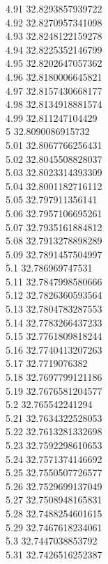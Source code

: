 {4.91	32.8293857939722\\
4.92	32.8270957341098\\
4.93	32.8248122159278\\
4.94	32.8225352146799\\
4.95	32.8202647057362\\
4.96	32.8180006645821\\
4.97	32.8157430668177\\
4.98	32.8134918881574\\
4.99	32.811247104429\\
5	32.8090086915732\\
5.01	32.8067766256431\\
5.02	32.8045508828037\\
5.03	32.8023314393309\\
5.04	32.8001182716112\\
5.05	32.797911356141\\
5.06	32.7957106695261\\
5.07	32.7935161884812\\
5.08	32.7913278898289\\
5.09	32.7891457504997\\
5.1	32.786969747531\\
5.11	32.7847998580666\\
5.12	32.7826360593564\\
5.13	32.7804783287553\\
5.14	32.7783266437233\\
5.15	32.7761809818244\\
5.16	32.7740413207263\\
5.17	32.7719076382\\
5.18	32.7697799121186\\
5.19	32.7676581204577\\
5.2	32.765542241294\\
5.21	32.7634322528053\\
5.22	32.7613281332698\\
5.23	32.7592298610653\\
5.24	32.7571374146692\\
5.25	32.7550507726577\\
5.26	32.7529699137049\\
5.27	32.7508948165831\\
5.28	32.7488254601615\\
5.29	32.7467618234061\\
5.3	32.7447038853792\\
5.31	32.7426516252387\\
}
